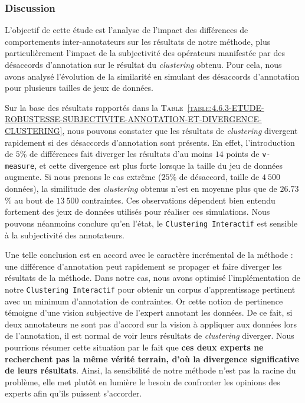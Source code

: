 		\subsubsection{Discussion}
		
			L'objectif de cette étude est l'analyse de l'impact des différences de comportements inter-annotateurs sur les résultats de notre méthode, plus particulièrement l'impact de la subjectivité des opérateurs manifestée par des désaccords d'annotation sur le résultat du \textit{clustering} obtenu.
			Pour cela, nous avons analysé l'évolution de la similarité en simulant des désaccords d'annotation pour plusieurs tailles de jeux de données.
			
			Sur la base des résultats rapportés dans la \textsc{Table~\ref{table:4.6.3-ETUDE-ROBUSTESSE-SUBJECTIVITE-ANNOTATION-ET-DIVERGENCE-CLUSTERING}}, nous pouvons constater que les résultats de \textit{clustering} divergent rapidement si des désaccords d'annotation sont présents.
			En effet, l'introduction de $5$\% de différences fait diverger les résultats d'au moins $14$ points de \texttt{v-measure}, et cette divergence est plus forte lorsque la taille du jeu de données augmente.
			Si nous prenons le cas extrême ($25$\% de désaccord, taille de $4~500$ données), la similitude des \textit{clustering} obtenus n'est en moyenne plus que de $26.73$\% au bout de $13~500$ contraintes.
			Ces observations dépendent bien entendu fortement des jeux de données utilisés pour réaliser ces simulations.
			Nous pouvons néanmoins conclure qu'en l'état, le \texttt{Clustering Interactif} est sensible à la subjectivité des annotateurs.
			
			Une telle conclusion est en accord avec le caractère incrémental de la méthode : une différence d'annotation peut rapidement se propager et faire diverger les résultats de la méthode.
			Dans notre cas, nous avons optimisé l'implémentation de notre \texttt{Clustering Interactif} pour obtenir un corpus d'apprentissage pertinent avec un minimum d'annotation de contraintes.
			Or cette notion de pertinence témoigne d'une vision subjective de l'expert annotant les données.
			De ce fait, si deux annotateurs ne sont pas d'accord sur la vision à appliquer aux données lors de l'annotation, il est normal de voir leurs résultats de \textit{clustering} diverger.
			Nous pourrions résumer cette situation par le fait que \textbf{ces deux experts ne recherchent pas la même vérité terrain, d'où la divergence significative de leurs résultats}.
			Ainsi, la sensibilité de notre méthode n'est pas la racine du problème, elle met plutôt en lumière le besoin de confronter les opinions des experts afin qu'ils puissent s'accorder.
			
